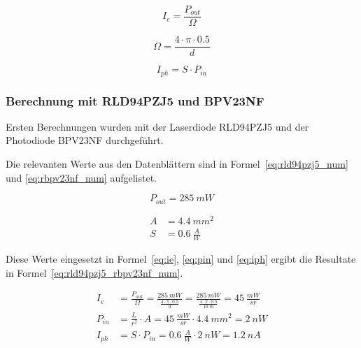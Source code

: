 \documentclass[11pt,a4paper,hidelinks]{article}
\begin{document}
\begin{equation}\label{eq:ie}
    I_e = \frac{P_{out}}{\Omega}
\end{equation}

\begin{equation}\label{eq:omega}
    \Omega = \frac{4\cdot \pi \cdot 0.5}{d}
\end{equation}

\begin{equation}\label{eq:iph}
    I_{ph} = S \cdot P_{in}
\end{equation}

\subsubsection{Berechnung mit RLD94PZJ5 und BPV23NF}

Ersten Berechnungen wurden mit der Laserdiode RLD94PZJ5 \cite{rohm2020rld94pzj5_datasheet} und der Photodiode BPV23NF
\cite{vishay2024bpv23nf_datasheet} durchgeführt.

Die relevanten Werte aus den Datenblättern sind in Formel~\ref{eq:rld94pzj5_num} und \ref{eq:rbpv23nf_num} aufgelistet.

\begin{equation}\label{eq:rld94pzj5_num}
    P_{out} = 285~mW
\end{equation}

\begin{equation}\label{eq:rbpv23nf_num}
    \begin{split}
        A &= 4.4~mm^2\\
        S &= 0.6~\frac{A}{W}
    \end{split}
\end{equation}

Diese Werte eingesetzt in Formel~\ref{eq:ie}, \ref{eq:pin} und \ref{eq:iph} ergibt die Resultate in
Formel~\ref{eq:rld94pzj5_rbpv23nf_num}.

\begin{equation}\label{eq:rld94pzj5_rbpv23nf_num}
    \begin{split}
        I_e    &= \frac{P_{out}}{\Omega} = \frac{285~mW}{\frac{4\cdot \pi \cdot 0.5}{d}} = \frac{285~mW}{\frac{4\cdot \pi \cdot 0.5}{10~m}} = 45~\frac{mW}{sr}\\
        P_{in} &= \frac{I_e}{r^2} \cdot A = 45~\frac{mW}{sr} \cdot 4.4~mm^2 = 2~nW\\
        I_{ph} &= S \cdot P_{in} = 0.6~\frac{A}{W} \cdot 2~nW = 1.2~nA
    \end{split}
\end{equation}
\end{document}
